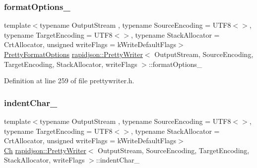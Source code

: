 \subsubsection{\texorpdfstring{formatOptions\_}{formatOptions\_}}
{\footnotesize\ttfamily template$<$typename Output\+Stream , typename Source\+Encoding  = U\+T\+F8$<$$>$, typename Target\+Encoding  = U\+T\+F8$<$$>$, typename Stack\+Allocator  = Crt\+Allocator, unsigned write\+Flags = k\+Write\+Default\+Flags$>$ \\
\mbox{\hyperlink{namespacerapidjson_a084b31753ef2edefdeca8a5374eccc4b}{Pretty\+Format\+Options}} \mbox{\hyperlink{classrapidjson_1_1_pretty_writer}{rapidjson\+::\+Pretty\+Writer}}$<$ Output\+Stream, Source\+Encoding, Target\+Encoding, Stack\+Allocator, write\+Flags $>$\+::format\+Options\+\_\+\hspace{0.3cm}{\ttfamily [protected]}}



Definition at line 259 of file prettywriter.\+h.

\mbox{\label{classrapidjson_1_1_pretty_writer_ad5492530262115dee2b44fc7682ddc07}} 
\subsubsection{\texorpdfstring{indentChar\_}{indentChar\_}}
{\footnotesize\ttfamily template$<$typename Output\+Stream , typename Source\+Encoding  = U\+T\+F8$<$$>$, typename Target\+Encoding  = U\+T\+F8$<$$>$, typename Stack\+Allocator  = Crt\+Allocator, unsigned write\+Flags = k\+Write\+Default\+Flags$>$ \\
\mbox{\hyperlink{classrapidjson_1_1_pretty_writer_a74a38902073aa599c8bcc6a3ca6126d0}{Ch}} \mbox{\hyperlink{classrapidjson_1_1_pretty_writer}{rapidjson\+::\+Pretty\+Writer}}$<$ Output\+Stream, Source\+Encoding, Target\+Encoding, Stack\+Allocator, write\+Flags $>$\+::indent\+Char\+\_\+\hspace{0.3cm}{\ttfamily [protected]}}



